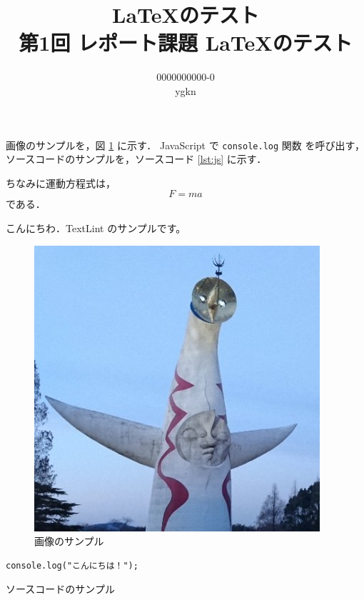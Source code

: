 \documentclass[a4paper, 12pt, uplatex]{jsarticle}
\author{0000000000-0 \\ ygkn}
\title{\LaTeX のテスト\\第1回 レポート課題 \LaTeX のテスト}
\date{}
\begin{document}
\maketitle


画像のサンプルを，図 \ref{fig:image} に示す．
JavaScript で \texttt{console.log} 関数 \cite{consolel20:online} を呼び出す，
ソースコードのサンプルを，ソースコード \ref{lst:js} に示す．

ちなみに運動方程式は，
\[
  F=ma
\]
である．


こんにちわ．TextLint のサンプルです。

\begin{figure}[ht]
  \begin{center}
    \includegraphics[width=0.25\linewidth]{image.jpg}
  \end{center}
  \caption{画像のサンプル}
  \label{fig:image}
\end{figure}

\begin{listing}[ht]
  \begin{verbatim}
console.log("こんにちは！");
  \end{verbatim}
  \caption{ソースコードのサンプル}
  \label{lst:js}
\end{listing}




\end{document}
